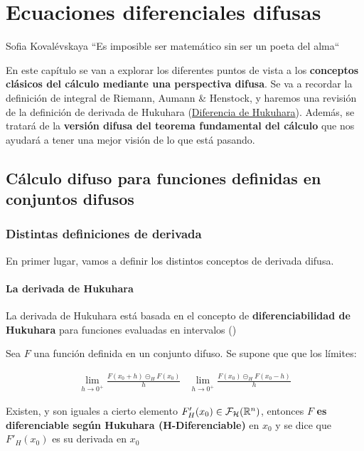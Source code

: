 
\chapter{Ecuaciones diferenciales difusas}
\begin{chapquote}{Sofia Kovalévskaya}
	``Es imposible ser matemático sin ser un poeta del alma``
\end{chapquote}
En este capítulo se van a explorar los diferentes puntos de vista a los \textbf{conceptos clásicos del cálculo mediante una perspectiva difusa}. Se va a recordar la definición de integral de Riemann, Aumann \& Henstock, y haremos una revisión de la definición de derivada de Hukuhara (\hyperref[def:hukukara]{Diferencia de Hukuhara}). Además, se tratará de la \textbf{versión difusa del teorema fundamental del cálculo} que nos ayudará a tener una mejor visión de lo que está pasando.

\section{Cálculo difuso para funciones definidas en conjuntos difusos}
\subsection{Distintas definiciones de derivada}
En primer lugar, vamos a definir los distintos conceptos de derivada difusa.

\subsubsection{La derivada de Hukuhara}
La derivada de Hukuhara está basada en el concepto de \textbf{diferenciabilidad de Hukuhara} para funciones evaluadas en intervalos (\cite{derivatehukuhara})

\begin{definicion}
  Sea $F$ una función definida en un conjunto difuso. Se supone que que los límites:
  
  \[
  \begin{array}{c||c}
    \lim\limits_{h \rightarrow 0^+} \frac{F(x_0 + h) \circleddash_H F(x_0)}{h} & \lim\limits_{h \rightarrow 0^+} \frac{F(x_0) \circleddash_H F(x_0 - h)}{h}
  \end{array}
  \]
  
  Existen, y son iguales a cierto elemento $F'_H(x_0) \in \mathcal{F}_\mathcal{H}(\mathbb R^n)$, entonces $F$ \textbf{es diferenciable según Hukuhara (H-Diferenciable)} en $x_0$ y se dice que $F'_H(x_0)$ es su derivada en $x_0$ 
\end{definicion}

